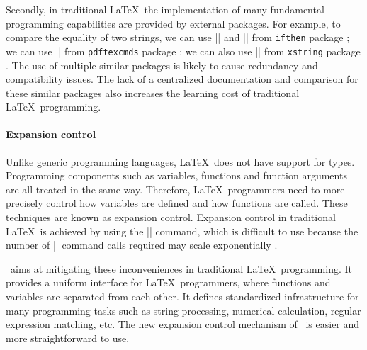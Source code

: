 \documentclass{ltugboat}
\begin{document}
Secondly, in traditional \LaTeX~the implementation of many fundamental programming capabilities are provided by external packages.
For example, to compare the equality of two strings, we can use \inltex|\ifthenelse| and \inltex|\equal| from \verb|ifthen| package \cite{pkg:ifthen};
we can use \inltex|\pdfstrcmp| from \verb|pdftexcmds| package \cite{pkg:pdftexcmds};
we can also use \inltex|\IfStrEq| from \verb|xstring| package \cite{pkg:xstring}. 
The use of multiple similar packages is likely to cause redundancy and compatibility issues.
The lack of a centralized documentation and comparison for these similar packages also increases the learning cost of traditional \LaTeX\ programming.

\paragraph{Expansion control} 


Unlike generic programming languages, \LaTeX\ does not have support for types.
Programming components such as variables, functions and function arguments are all treated in the same way.
Therefore, \LaTeX~programmers need to more precisely control how variables are defined and how functions are called. 
These techniques are known as expansion control. 
Expansion control in traditional \LaTeX~is achieved by using the \inltex|\expandafter| command, which is difficult to use because the number of \inltex|\expandafter| command calls required may scale exponentially \cite{bechtolsheim1988tutorial}.

\liii~aims at mitigating these inconveniences in traditional \LaTeX\ programming.
It provides a uniform interface for \LaTeX~programmers, where functions and variables are separated from each other. 
It defines standardized infrastructure for many programming tasks such as string processing, numerical calculation, regular expression matching, etc.
The new expansion control mechanism of \liii\ is easier and more straightforward to use.
\end{document}
